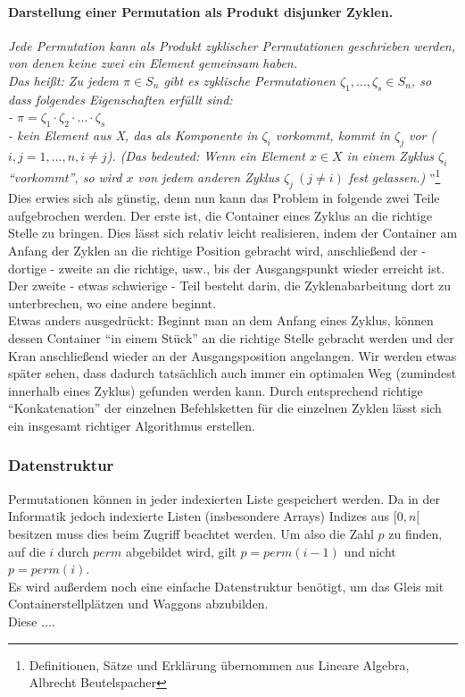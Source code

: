 \paragraph{Darstellung einer Permutation als Produkt disjunker Zyklen.}
\emph{Jede Permutation kann als Produkt zyklischer Permutationen geschrieben werden, von denen keine zwei ein Element gemeinsam haben.}\\
\emph{Das heißt: Zu jedem $\pi \in S_n$ gibt es zyklische Permutationen $\zeta_1,\dots,\zeta_s \in S_n$,
so dass folgendes Eigenschaften erfüllt sind: \\
 - $\pi=\zeta_1\cdot \zeta_2 \cdot \ldots \cdot \zeta_s$ \\
 - kein Element aus X, das als Komponente in $\zeta_i$ vorkommt, kommt in $\zeta_j$ vor ($i,j=1,\dots,n, i \neq j$).
(Das bedeuted: Wenn ein Element $x \in X$ in einem Zyklus $\zeta_i$ ``vorkommt'',
 so wird $x$ von jedem anderen Zyklus $\zeta_j \: (j \neq i)$ fest gelassen.)
}''\footnote{Definitionen, Sätze und Erklärung übernommen aus Lineare Algebra, Albrecht Beutelspacher}\\
Dies erwies sich als günstig, denn nun kann das Problem in folgende zwei Teile aufgebrochen werden.
Der erste ist, die Container eines Zyklus an die richtige Stelle zu bringen.
Dies lässt sich relativ leicht realisieren, indem der Container am Anfang der Zyklen an die richtige Position gebracht wird, anschließend der - dortige - zweite an die richtige, usw., bis der Ausgangspunkt wieder erreicht ist.
Der zweite - etwas schwierige - Teil besteht darin, die Zyklenabarbeitung dort zu unterbrechen, wo eine andere beginnt. \\
Etwas anders ausgedrückt:
Beginnt man an dem Anfang eines Zyklus, können dessen Container ``in einem Stück'' an die richtige Stelle gebracht werden und der Kran anschließend wieder an der Ausgangsposition angelangen.
Wir werden etwas später sehen, dass dadurch tatsächlich auch immer ein optimalen Weg (zumindest innerhalb eines Zyklus) gefunden werden kann.
Durch entsprechend richtige ``Konkatenation'' der einzelnen Befehlsketten für die einzelnen Zyklen lässt sich ein insgesamt richtiger Algorithmus erstellen.
\subsubsection{Datenstruktur}
Permutationen können in jeder indexierten Liste gespeichert werden.
Da in der Informatik jedoch indexierte Listen (insbesondere Arrays) Indizes aus $[0,n[$ besitzen muss dies beim Zugriff beachtet werden.
Um also die Zahl $p$ zu finden, auf die $i$ durch $perm$ abgebildet wird, gilt $p = perm(i-1)$ und nicht $p = perm(i)$. \\
Es wird außerdem noch eine einfache Datenstruktur benötigt, um das Gleis mit Containerstellplätzen und Waggons abzubilden. \\
Diese ....
